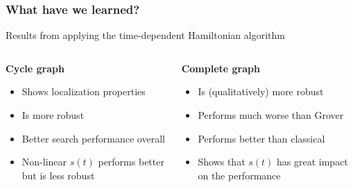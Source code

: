 \documentclass{beamer}
\newcommand{\bb}[1]{\textbf{\textcolor{darkish_blue}{#1}}}
\begin{document}

\begin{frame}
\frametitle{What have we learned?}

\centering 
Results from applying the time-dependent Hamiltonian algorithm
\vspace{0.2cm} 
\begin{columns}

	\begin{column}[T]{0.4\textwidth}
	{
	\centering
	\begin{tcolorbox}[width=2.5cm, colframe=darkblue, colback=white, halign=center, left=0pt, right=0pt, top=2pt, bottom=2pt]
	\bb{Cycle graph\\} 
	\end{tcolorbox}
	}
	\begin{itemize}
		\item Shows localization properties
		\item Is more robust
		\item Better search performance overall
		\item Non-linear $s(t)$ performs better but is less robust
	\end{itemize}

	\end{column}

	\begin{column}[T]{0.4\textwidth}
	{
	\centering
	\begin{tcolorbox}[width=3.5cm, colframe=darkblue, colback=white, halign=center, left=0pt, right=0pt, top=2pt, bottom=2pt]
	\bb{Complete graph} 
	\end{tcolorbox}
	}
	\begin{itemize}
		\item Is (qualitatively) more robust
		\item Performs much worse than Grover
		\item Performs better than classical
		\item Shows that $s(t)$ has great impact on the performance
	\end{itemize}

	\end{column}

\end{columns}

\end{frame}

\end{document}
